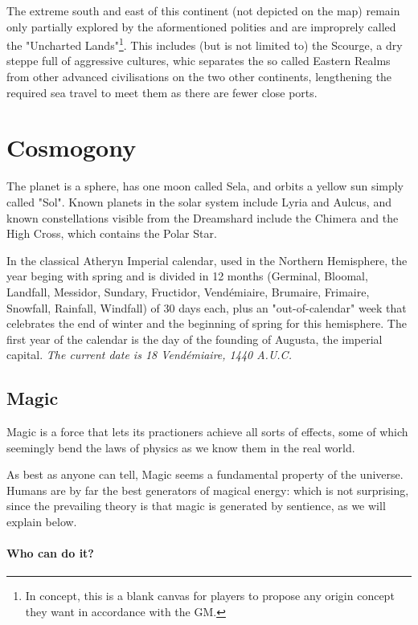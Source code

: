 The extreme south and east of this continent (not depicted on the map) remain only partially explored by the aformentioned polities and are improprely called the "Uncharted Lands"\footnote{In concept, this is a blank canvas for players to propose any origin concept they want in accordance with the GM.}. This includes (but is not limited to) the Scourge, a dry steppe full of aggressive cultures, whic separates the so called Eastern Realms from other advanced civilisations on the two other continents, lengthening the required sea travel to meet them as there are fewer close ports.

\section{Cosmogony}

The planet is a sphere, has one moon called Sela, and orbits a yellow sun simply called "Sol". Known planets in the solar system include Lyria and Aulcus, and known constellations visible from the Dreamshard include the Chimera and the High Cross, which contains the Polar Star.

In the classical Atheryn Imperial calendar, used in the Northern Hemisphere, the year beging with spring and is divided in 12 months (Germinal, Bloomal, Landfall, Messidor, Sundary, Fructidor, Vendémiaire, Brumaire, Frimaire, Snowfall, Rainfall, Windfall) of 30 days each, plus an "out-of-calendar" week that celebrates the end of winter and the beginning of spring for this hemisphere. The first year of the calendar is the day of the founding of Augusta, the imperial capital. \textit{The current date is 18 Vendémiaire, 1440 A.U.C.}


\subsection{Magic}

\label{magic_lore}

Magic is a force that lets its practioners achieve all sorts of effects, some of which seemingly bend the laws of physics as we know them in the real world.

As best as anyone can tell, Magic seems a fundamental property of the universe. Humans are by far the best generators of magical energy: which is not surprising, since the prevailing theory is that magic is generated by sentience, as we will explain below.


\paragraph{Who can do it?}

